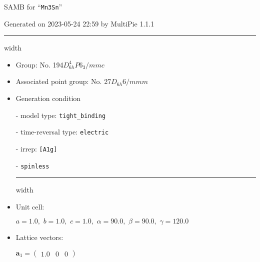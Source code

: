 \documentclass[fleqn,10pt,landscape]{article}
\begin{document}
\setcounter{MaxMatrixCols}{16}

\setlength{\baselineskip}{16pt}
\footnotesize
\begin{center}
\LARGE
SAMB for ``\texttt{Mn3Sn}''
\end{center}
\begin{flushright}
Generated on 2023-05-24 22:59 by MultiPie 1.1.1
\end{flushright}
\vspace{1cm}


 \hfil \hrule height 1mm width \textwidth \hfil

\begin{itemize}
\item Group: No. 194\quad$D_{6h}^{4}$\quad$P6_3/mmc$\quad[ hexagonal ]

\item Associated point group: No. 27\quad$D_{6h}$\quad$6/mmm$\quad[ hexagonal ]

\vspace{5mm}

\item Generation condition

\quad - model type: \texttt{tight_binding}

\quad - time-reversal type: \texttt{electric}

\quad - irrep: \texttt{[A1g]}

\quad - \texttt{spinless}


 \hfil \hrule height 1mm width \textwidth \hfil

\item Unit cell:

\quad $a=1.0,\,\, b=1.0,\,\, c=1.0,\,\, \alpha=90.0,\,\, \beta=90.0,\,\, \gamma=120.0$

\item Lattice vectors:

\quad $\bm{a}_1=\begin{pmatrix} 1.0 & 0 & 0 \end{pmatrix}$


\end{itemize}
\end{document}
